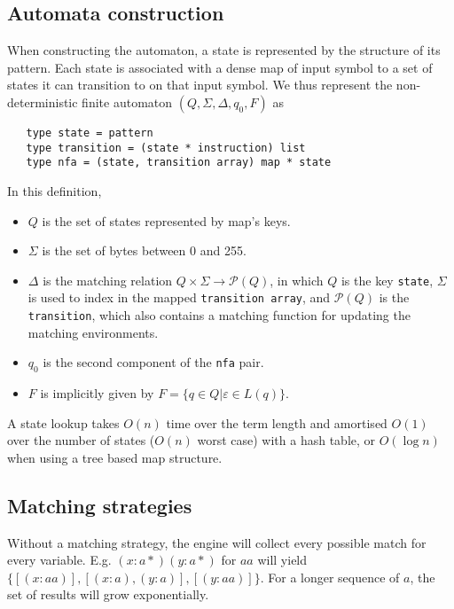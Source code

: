 \subsection{Automata construction}

When constructing the automaton, a state is represented by the structure of its
pattern. Each state is associated with a dense map of input symbol to a set of
states it can transition to on that input symbol. We thus represent the
non-deterministic finite automaton $(Q, \Sigma, \Delta, q_0, F)$ as

\begin{lstlisting}
   type state = pattern
   type transition = (state * instruction) list
   type nfa = (state, transition array) map * state
\end{lstlisting}

In this definition,

\begin{itemize}
   \item $Q$ is the set of states represented by map's keys.
   \item $\Sigma$ is the set of bytes between 0 and 255.
   \item $\Delta$ is the matching relation $Q \times \Sigma \to \mathcal{P}(Q)$,
      in which $Q$ is the key \texttt{state}, $\Sigma$ is used to index in the
      mapped \texttt{transition array}, and $\mathcal{P}(Q)$ is the
      \texttt{transition}, which also contains a matching function for updating
      the matching environments.
   \item $q_0$ is the second component of the \texttt{nfa} pair.
   \item $F$ is implicitly given by $F = \{ q \in Q | \varepsilon \in L(q) \}$.
\end{itemize}

A state lookup takes $O(n)$ time over the term length and amortised $O(1)$ over
the number of states ($O(n)$ worst case) with a hash table, or $O(\log n)$ when
using a tree based map structure.


\subsection{Matching strategies}

Without a matching strategy, the engine will collect every possible match for
every variable. E.g. $(x:a*)(y:a*)$ for $aa$ will yield $\{[(x:aa)], [(x:a),
(y:a)], [(y:aa)]\}$. For a longer sequence of $a$, the set of results will grow
exponentially.

